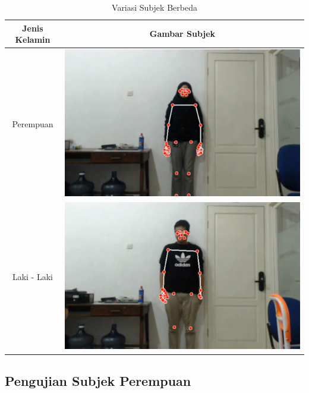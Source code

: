 \begin{longtable}{|c|c|}
  \caption{Variasi Subjek Berbeda}
  \label{tb:kondisisubjek}                                   \\
  \hline
  \rowcolor[HTML]{C0C0C0}
  \textbf{Jenis Kelamin} & \textbf{Gambar Subjek}  \\
  \hline
  Perempuan            &  \includegraphics[scale=0.3]{gambar/bab4-rani.png}                \\
  \hline
  Laki - Laki            & \includegraphics[scale=0.3]{gambar/bab4-evan.png}                 \\
  \hline
\end{longtable}

\subsection{Pengujian Subjek Perempuan}
\label{sec:analisisperempuan}

